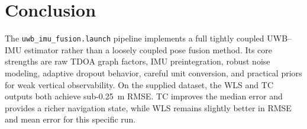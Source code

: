 \documentclass[11pt,a4paper]{article}
\begin{document}
\section{Conclusion}

The \texttt{uwb\_imu\_fusion.launch} pipeline implements a full tightly coupled UWB--IMU estimator rather than a loosely coupled pose fusion method. Its core strengths are raw TDOA graph factors, IMU preintegration, robust noise modeling, adaptive dropout behavior, careful unit conversion, and practical priors for weak vertical observability. On the supplied dataset, the WLS and TC outputs both achieve sub-\SI{0.25}{m} RMSE. TC improves the median error and provides a richer navigation state, while WLS remains slightly better in RMSE and mean error for this specific run.
\end{document}
